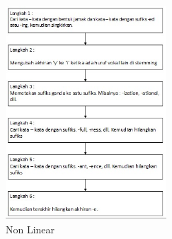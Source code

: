          \begin{figure}[!htpb]
        \centering
        \includegraphics[width=6cm]{figures/porter_step.PNG}
        \caption{Non Linear
        \label{6step}}
        \end{figure} 
